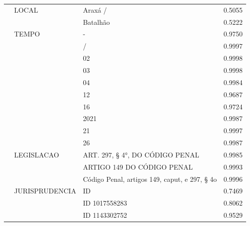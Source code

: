 \begin{table}
\begin{tabular}{llp{6cm}r}
 & LOCAL & Araxá / & 0.5055 \\
 &  & Batalhão & 0.5222 \\
 & TEMPO & - & 0.9750 \\
 &  & / & 0.9997 \\
 &  & 02 & 0.9998 \\
 &  & 03 & 0.9998 \\
 &  & 04 & 0.9984 \\
 &  & 12 & 0.9687 \\
 &  & 16 & 0.9724 \\
 &  & 2021 & 0.9987 \\
 &  & 21 & 0.9997 \\
 &  & 26 & 0.9987 \\
 & LEGISLACAO & ART. 297, § 4°, DO CÓDIGO PENAL & 0.9985 \\
 &  & ARTIGO 149 DO CÓDIGO PENAL & 0.9993 \\
 &  & Código Penal, artigos 149, caput, e 297, § 4o & 0.9996 \\
 & JURISPRUDENCIA & ID & 0.7469 \\
 &  & ID 1017558283 & 0.8062 \\
 &  & ID 1143302752 & 0.9529 \\
\bottomrule
\end{tabular}
\end{table}
